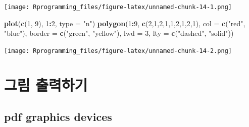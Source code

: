 \documentclass[10pt,]{krantz}
\makeatletter
\newenvironment{Shaded}{\begin{snugshade}}{\end{snugshade}}
\newcommand{\KeywordTok}[1]{\textcolor[rgb]{0.13,0.29,0.53}{\textbf{#1}}}
\newcommand{\DataTypeTok}[1]{\textcolor[rgb]{0.13,0.29,0.53}{#1}}
\newcommand{\DecValTok}[1]{\textcolor[rgb]{0.00,0.00,0.81}{#1}}
\newcommand{\StringTok}[1]{\textcolor[rgb]{0.31,0.60,0.02}{#1}}
\newcommand{\OperatorTok}[1]{\textcolor[rgb]{0.81,0.36,0.00}{\textbf{#1}}}
\newcommand{\NormalTok}[1]{#1}
\newenvironment{kframe}{%
\medskip{}
\setlength{\fboxsep}{.8em}
 \def\at@end@of@kframe{}%
 \ifinner\ifhmode%
  \def\at@end@of@kframe{\end{minipage}}%
  \begin{minipage}{\columnwidth}%
 \fi\fi%
 \def\FrameCommand##1{\hskip\@totalleftmargin \hskip-\fboxsep
 \colorbox{shadecolor}{##1}\hskip-\fboxsep
     \hskip-\linewidth \hskip-\@totalleftmargin \hskip\columnwidth}%
 \MakeFramed {\advance\hsize-\width
   \@totalleftmargin\z@ \linewidth\hsize
   \@setminipage}}%
 {\par\unskip\endMakeFramed%
 \at@end@of@kframe}
\renewenvironment{Shaded}{\begin{kframe}}{\end{kframe}}
\theoremstyle{definition}
\theoremstyle{definition}
\theoremstyle{remark}
\makeatother
\begin{document}
\texttt{[image: Rprogramming\_files/figure-latex/unnamed-chunk-14-1.png]}

\begin{Shaded}
\begin{Highlighting}[]


\KeywordTok{plot}\NormalTok{(}\KeywordTok{c}\NormalTok{(}\DecValTok{1}\NormalTok{, }\DecValTok{9}\NormalTok{), }\DecValTok{1}\OperatorTok{:}\DecValTok{2}\NormalTok{, }\DataTypeTok{type =} \StringTok{"n"}\NormalTok{)}
\KeywordTok{polygon}\NormalTok{(}\DecValTok{1}\OperatorTok{:}\DecValTok{9}\NormalTok{, }\KeywordTok{c}\NormalTok{(}\DecValTok{2}\NormalTok{,}\DecValTok{1}\NormalTok{,}\DecValTok{2}\NormalTok{,}\DecValTok{1}\NormalTok{,}\DecValTok{1}\NormalTok{,}\DecValTok{2}\NormalTok{,}\DecValTok{1}\NormalTok{,}\DecValTok{2}\NormalTok{,}\DecValTok{1}\NormalTok{),}
        \DataTypeTok{col =} \KeywordTok{c}\NormalTok{(}\StringTok{"red"}\NormalTok{, }\StringTok{"blue"}\NormalTok{),}
        \DataTypeTok{border =} \KeywordTok{c}\NormalTok{(}\StringTok{"green"}\NormalTok{, }\StringTok{"yellow"}\NormalTok{),}
        \DataTypeTok{lwd =} \DecValTok{3}\NormalTok{, }\DataTypeTok{lty =} \KeywordTok{c}\NormalTok{(}\StringTok{"dashed"}\NormalTok{, }\StringTok{"solid"}\NormalTok{))}
\end{Highlighting}
\end{Shaded}

\texttt{[image: Rprogramming\_files/figure-latex/unnamed-chunk-14-2.png]}

\section{그림 출력하기}\label{print}

\subsection{pdf graphics devices}\label{pdf-graphics-devices}
\end{document}
